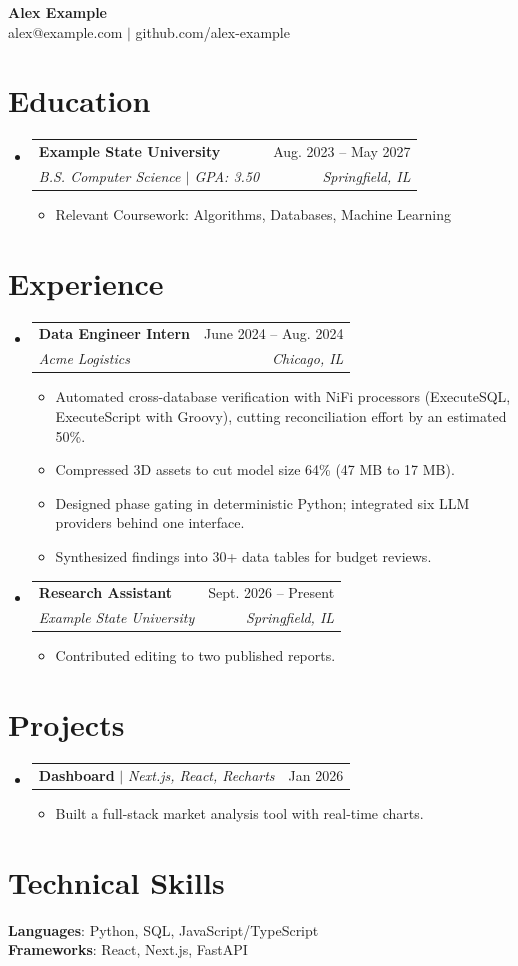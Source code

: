 \documentclass[letterpaper,10pt]{article}
\makeatletter
\newcommand{\resumeItem}[1]{
  \item\small{
    {#1 \vspace{-2pt}}
  }
}
\newcommand{\resumeSubheading}[4]{
  \vspace{-5pt}\item
    \begin{tabular*}{0.97\textwidth}[t]{l@{\extracolsep{\fill}}r}
      \textbf{\small#1} & \small#2 \\
      \textit{\small#3} & \textit{\small #4} \\
    \end{tabular*}\vspace{-1pt}
}
\newcommand{\resumeProjectHeading}[2]{
    \vspace{-3pt}\item
    \begin{tabular*}{0.97\textwidth}{l@{\extracolsep{\fill}}r}
      \small#1 & \small#2 \\
    \end{tabular*}\vspace{-0.9pt}
}
\newcommand{\resumeSubHeadingListStart}{\begin{itemize}[leftmargin=0.15in, label={}, itemsep=14.1pt]}
\newcommand{\resumeSubHeadingListEnd}{\end{itemize}}
\newcommand{\resumeItemListStart}{\begin{itemize}}
\newcommand{\resumeItemListEnd}{\end{itemize}\vspace{-7.1pt}}
\makeatother
\begin{document}
\begin{center}
    {\huge \bfseries Alex Example} \\ \vspace{1pt}
    \small
    alex@example.com $|$ github.com/alex-example
\end{center}

\section{Education}
  \resumeSubHeadingListStart
    \resumeSubheading
      {Example State University}{Aug. 2023 -- May 2027}
      {B.S. Computer Science $|$ GPA: 3.50}{Springfield, IL}
      \resumeItemListStart
        \resumeItem{Relevant Coursework: Algorithms, Databases, Machine Learning}
      \resumeItemListEnd
  \resumeSubHeadingListEnd

\section{Experience}
  \resumeSubHeadingListStart
    \resumeSubheading
      {Data Engineer Intern}{June 2024 -- Aug. 2024}
      {Acme Logistics}{Chicago, IL}
      \resumeItemListStart
        \resumeItem{Automated cross-database verification with NiFi processors (ExecuteSQL, ExecuteScript with Groovy), cutting reconciliation effort by an estimated 50\%.}
        \resumeItem{Compressed 3D assets to cut model size 64\% (47 MB to 17 MB).}
        \resumeItem{Designed phase gating in deterministic Python; integrated six LLM providers behind one interface.}
        \resumeItem{Synthesized findings into 30+ data tables for budget reviews.}
      \resumeItemListEnd
    \resumeSubheading
      {Research Assistant}{Sept. 2026 -- Present}
      {Example State University}{Springfield, IL}
      \resumeItemListStart
        \resumeItem{Contributed editing to two published reports.}
      \resumeItemListEnd
  \resumeSubHeadingListEnd

\section{Projects}
  \resumeSubHeadingListStart
    \resumeProjectHeading
      {\textbf{Dashboard} $|$ \emph{Next.js, React, Recharts}}{Jan 2026}
      \resumeItemListStart
        \resumeItem{Built a full-stack market analysis tool with real-time charts.}
      \resumeItemListEnd
  \resumeSubHeadingListEnd

\section{Technical Skills}
 \begin{itemize}[leftmargin=0.15in, label={}]
    \small{\item{
     \textbf{Languages}{: Python, SQL, JavaScript/TypeScript} \\
     \textbf{Frameworks}{: React, Next.js, FastAPI}
    }}
 \end{itemize}
\end{document}
